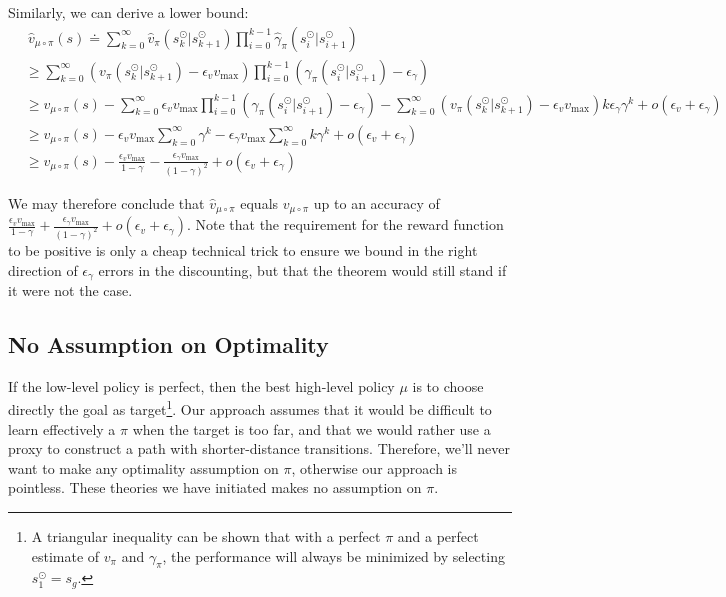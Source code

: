 Similarly, we can derive a lower bound:
\begin{align}
    &\ \hat{v}_{\mu\circ\pi}(s) \doteq \sum_{k=0}^\infty \hat{v}_\pi(s^{\odot}_k|s^{\odot}_{k+1}) \prod_{i=0}^{k-1}\hat{\gamma}_\pi (s^{\odot}_i|s^{\odot}_{i+1})  \\
    &\geq \sum_{k=0}^\infty \left(v_\pi(s^{\odot}_k|s^{\odot}_{k+1})-\epsilon_v  v_{\text{max}}\right) \prod_{i=0}^{k-1}\left(\gamma_\pi(s^{\odot}_i|s^{\odot}_{i+1})-\epsilon_\gamma\right)  \\
    &\geq v_{\mu\circ\pi}(s) - \sum_{k=0}^\infty \epsilon_v  v_{\text{max}} \prod_{i=0}^{k-1}\left(\gamma_\pi(s^{\odot}_i|s^{\odot}_{i+1})-\epsilon_\gamma\right) - \sum_{k=0}^\infty \left(v_\pi(s^{\odot}_k|s^{\odot}_{k+1})-\epsilon_v v_{\text{max}}\right) k\epsilon_\gamma\gamma^k + o(\epsilon_v+\epsilon_\gamma)  \\
    &\geq v_{\mu\circ\pi}(s) - \epsilon_v  v_{\text{max}} \sum_{k=0}^\infty  \gamma^k - \epsilon_\gamma v_{\text{max}} \sum_{k=0}^\infty k\gamma^k  + o(\epsilon_v+\epsilon_\gamma) \\
    &\geq v_{\mu\circ\pi}(s) - \frac{\epsilon_v  v_{\text{max}}}{1-\gamma} - \frac{\epsilon_\gamma v_{\text{max}}}{(1-\gamma)^2}  + o(\epsilon_v+\epsilon_\gamma)
\end{align}

We may therefore conclude that $\hat{v}_{\mu\circ\pi}$ equals $v_{\mu\circ\pi}$ up to an accuracy of $\frac{\epsilon_v  v_{\text{max}}}{1-\gamma} + \frac{\epsilon_\gamma v_{\text{max}}}{(1-\gamma)^2}  + o(\epsilon_v+\epsilon_\gamma)$. Note that the requirement for the reward function to be positive is only a cheap technical trick to ensure we bound in the right direction of $\epsilon_\gamma$ errors in the discounting, but that the theorem would still stand if it were not the case.

\subsection{No Assumption on Optimality}
If the low-level policy \red{$\pi$} is perfect, then the best high-level policy $\mu$ is to choose directly the goal as target\footnote{A triangular inequality can be shown that with a perfect $\pi$ and a perfect estimate of $v_\pi$ and $\gamma_\pi$, the performance will always be minimized by selecting $s_1^\odot=s_g$.}. Our approach assumes that it would be difficult to learn effectively a $\pi$ when the target is too far, and that we would rather use a proxy to construct a path with shorter-distance transitions. Therefore, we'll never want to make any optimality assumption on $\pi$, otherwise our approach is pointless. These theories we have initiated makes no assumption on $\pi$.
